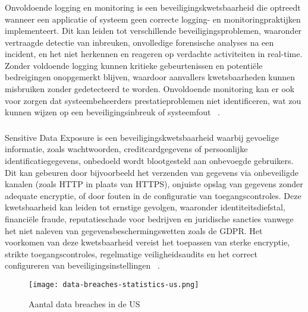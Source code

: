 \subsubsection{}
Onvoldoende logging en monitoring is een beveiligingskwetsbaarheid die optreedt wanneer een applicatie of systeem geen 
correcte logging- en monitoringpraktijken implementeert. Dit kan leiden tot verschillende beveiligingsproblemen, waaronder 
vertraagde detectie van inbreuken, onvolledige forensische analyses na een incident, en het niet herkennen en reageren op 
verdachte activiteiten in real-time. Zonder voldoende logging kunnen kritieke gebeurtenissen en potentiële bedreigingen 
onopgemerkt blijven, waardoor aanvallers kwetsbaarheden kunnen misbruiken zonder gedetecteerd te worden. Onvoldoende 
monitoring kan er ook voor zorgen dat systeembeheerders prestatieproblemen niet identificeren, wat zou kunnen 
wijzen op een beveiligingsinbreuk of systeemfout ~\autocite{Son2019}.

\subsubsection{}
Sensitive Data Exposure is een beveiligingskwetsbaarheid waarbij gevoelige informatie, zoals wachtwoorden, creditcardgegevens 
of persoonlijke identificatiegegevens, onbedoeld wordt blootgesteld aan onbevoegde gebruikers. Dit kan gebeuren door 
bijvoorbeeld het verzenden van gegevens via onbeveiligde kanalen (zoals HTTP in plaats van HTTPS), onjuiste opslag van 
gegevens zonder adequate encryptie, of door fouten in de configuratie van toegangscontroles. Deze kwetsbaarheid kan leiden 
tot ernstige gevolgen, waaronder identiteitsdiefstal, financiële fraude, reputatieschade voor bedrijven en juridische sancties 
vanwege het niet naleven van gegevensbeschermingswetten zoals de GDPR. Het voorkomen van deze kwetsbaarheid vereist het 
toepassen van sterke encryptie, strikte toegangscontroles, regelmatige veiligheidsaudits en het correct configureren van 
beveiligingsinstellingen ~\autocite{Priyawati2022}.

\begin{figure}
    \centering
    \texttt{[image: data-breaches-statistics-us.png]}
    \caption[Aantal data breaches in de US ]{Aantal data breaches in de US }
    \label{fig:data-breaches}
\end{figure}

